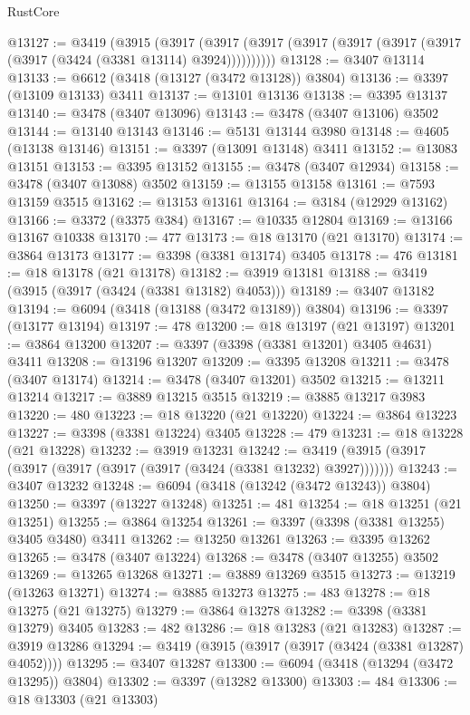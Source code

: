 \begin{lexlean}{RustCore}
\begin{coremodule}
@13127 := @3419
    (@3915
      (@3917 (@3917 (@3917 (@3917 (@3917 (@3917 (@3917 (@3917 (@3424 (@3381 @13114) @3924))))))))))
@13128 := @3407 @13114
@13133 := @6612 (@3418 (@13127 (@3472 @13128)) @3804)
@13136 := @3397 (@13109 @13133) @3411
@13137 := @13101 @13136
@13138 := @3395 @13137
@13140 := @3478 (@3407 @13096)
@13143 := @3478 (@3407 @13106) @3502
@13144 := @13140 @13143
@13146 := @5131 @13144 @3980
@13148 := @4605 (@13138 @13146)
@13151 := @3397 (@13091 @13148) @3411
@13152 := @13083 @13151
@13153 := @3395 @13152
@13155 := @3478 (@3407 @12934)
@13158 := @3478 (@3407 @13088) @3502
@13159 := @13155 @13158
@13161 := @7593 @13159 @3515
@13162 := @13153 @13161
@13164 := @3184 (@12929 @13162)
@13166 := @3372 (@3375 @384)
@13167 := @10335 @12804
@13169 := @13166 @13167 @10338
@13170 := 477
@13173 := @18 @13170 (@21 @13170)
@13174 := @3864 @13173
@13177 := @3398 (@3381 @13174) @3405
@13178 := 476
@13181 := @18 @13178 (@21 @13178)
@13182 := @3919 @13181
@13188 := @3419 (@3915 (@3917 (@3424 (@3381 @13182) @4053)))
@13189 := @3407 @13182
@13194 := @6094 (@3418 (@13188 (@3472 @13189)) @3804)
@13196 := @3397 (@13177 @13194)
@13197 := 478
@13200 := @18 @13197 (@21 @13197)
@13201 := @3864 @13200
@13207 := @3397 (@3398 (@3381 @13201) @3405 @4631) @3411
@13208 := @13196 @13207
@13209 := @3395 @13208
@13211 := @3478 (@3407 @13174)
@13214 := @3478 (@3407 @13201) @3502
@13215 := @13211 @13214
@13217 := @3889 @13215 @3515
@13219 := @3885 @13217 @3983
@13220 := 480
@13223 := @18 @13220 (@21 @13220)
@13224 := @3864 @13223
@13227 := @3398 (@3381 @13224) @3405
@13228 := 479
@13231 := @18 @13228 (@21 @13228)
@13232 := @3919 @13231
@13242 := @3419 (@3915 (@3917 (@3917 (@3917 (@3917 (@3917 (@3424 (@3381 @13232) @3927)))))))
@13243 := @3407 @13232
@13248 := @6094 (@3418 (@13242 (@3472 @13243)) @3804)
@13250 := @3397 (@13227 @13248)
@13251 := 481
@13254 := @18 @13251 (@21 @13251)
@13255 := @3864 @13254
@13261 := @3397 (@3398 (@3381 @13255) @3405 @3480) @3411
@13262 := @13250 @13261
@13263 := @3395 @13262
@13265 := @3478 (@3407 @13224)
@13268 := @3478 (@3407 @13255) @3502
@13269 := @13265 @13268
@13271 := @3889 @13269 @3515
@13273 := @13219 (@13263 @13271)
@13274 := @3885 @13273
@13275 := 483
@13278 := @18 @13275 (@21 @13275)
@13279 := @3864 @13278
@13282 := @3398 (@3381 @13279) @3405
@13283 := 482
@13286 := @18 @13283 (@21 @13283)
@13287 := @3919 @13286
@13294 := @3419 (@3915 (@3917 (@3917 (@3424 (@3381 @13287) @4052))))
@13295 := @3407 @13287
@13300 := @6094 (@3418 (@13294 (@3472 @13295)) @3804)
@13302 := @3397 (@13282 @13300)
@13303 := 484
@13306 := @18 @13303 (@21 @13303)

\end{coremodule}
\end{lexlean}
